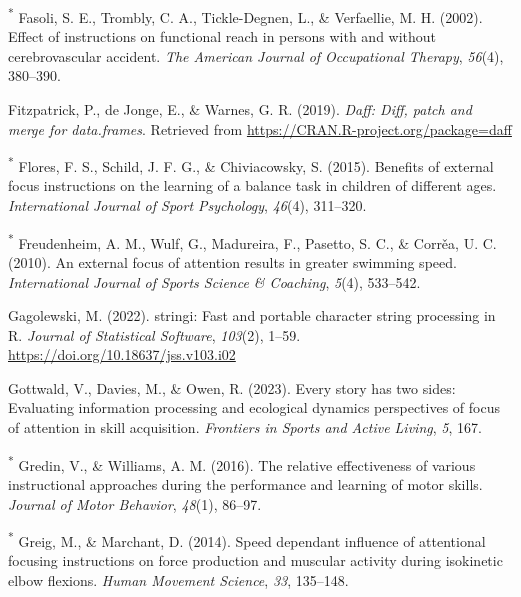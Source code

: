 \documentclass[
  man, donotrepeattitle,floatsintext]{apa7}
\newlength{\cslhangindent}
\newlength{\cslentryspacingunit} %
\newenvironment{CSLReferences}[2] %
 {%
  \setlength{\parindent}{0pt}
  \ifodd #1
  \let\oldpar\par
  \def\par{\hangindent=\cslhangindent\oldpar}
  \fi
  \setlength{\parskip}{#2\cslentryspacingunit}
 }%
 {}
\begin{document}
\begin{CSLReferences}{1}{0}
\leavevmode{}%
\textsuperscript{*} Fasoli, S. E., Trombly, C. A., Tickle-Degnen, L., \& Verfaellie, M. H. (2002). Effect of instructions on functional reach in persons with and without cerebrovascular accident. \emph{The American Journal of Occupational Therapy}, \emph{56}(4), 380--390.

\leavevmode{}%
Fitzpatrick, P., de Jonge, E., \& Warnes, G. R. (2019). \emph{Daff: Diff, patch and merge for data.frames}. Retrieved from \url{https://CRAN.R-project.org/package=daff}

\leavevmode{}%
\textsuperscript{*} Flores, F. S., Schild, J. F. G., \& Chiviacowsky, S. (2015). Benefits of external focus instructions on the learning of a balance task in children of different ages. \emph{International Journal of Sport Psychology}, \emph{46}(4), 311--320.

\leavevmode{}%
\textsuperscript{*} Freudenheim, A. M., Wulf, G., Madureira, F., Pasetto, S. C., \& Corrěa, U. C. (2010). An external focus of attention results in greater swimming speed. \emph{International Journal of Sports Science \& Coaching}, \emph{5}(4), 533--542.

\leavevmode{}%
Gagolewski, M. (2022). {stringi}: {F}ast and portable character string processing in {R}. \emph{Journal of Statistical Software}, \emph{103}(2), 1--59. \url{https://doi.org/10.18637/jss.v103.i02}

\leavevmode{}%
Gottwald, V., Davies, M., \& Owen, R. (2023). Every story has two sides: {Evaluating} information processing and ecological dynamics perspectives of focus of attention in skill acquisition. \emph{Frontiers in Sports and Active Living}, \emph{5}, 167.

\leavevmode{}%
\textsuperscript{*} Gredin, V., \& Williams, A. M. (2016). The relative effectiveness of various instructional approaches during the performance and learning of motor skills. \emph{Journal of Motor Behavior}, \emph{48}(1), 86--97.

\leavevmode{}%
\textsuperscript{*} Greig, M., \& Marchant, D. (2014). Speed dependant influence of attentional focusing instructions on force production and muscular activity during isokinetic elbow flexions. \emph{Human Movement Science}, \emph{33}, 135--148.


\end{CSLReferences}
\end{document}
